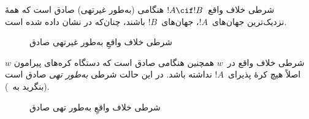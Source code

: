\documentclass[../../../include/open-logic-section]{subfiles}
\begin{document}


شرطی خلاف واقع~$!A \cif !B$ هنگامی (به‌طور غیرتهی) صادق است که همهٔ
نزدیک‌ترین جهان‌های~$!A$، جهان‌های~$!B$ باشند، چنان‌که در
 نشان داده شده است.
\begin{figure}
\begin{center}
\caption{شرطی خلاف واقعِ به‌طور غیرتهی صادق}
\end{center}
\end{figure}
شرطی خلاف واقع در~$w$ همچنین هنگامی صادق است که دستگاه کره‌های پیرامون
$w$ اصلاً هیچ کرهٔ پذیرای~$!A$ نداشته باشد. در این حالت شرطی
\emph{به‌طور تهی} صادق است (بنگرید به~).
\begin{figure}
\begin{center}
\caption{شرطی خلاف واقعِ به‌طور تهی صادق}
\end{center}
\end{figure}
\end{document}
